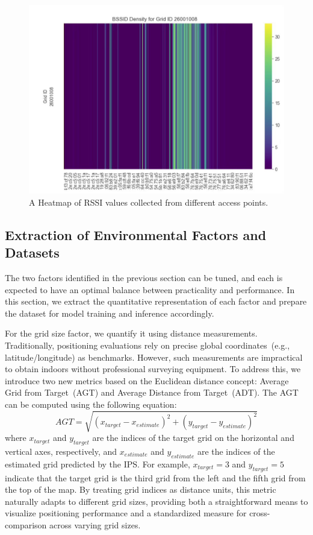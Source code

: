 \documentclass[runningheads]{llncs}
\begin{document}
\begin{figure}[th!]
        \centering
        \includegraphics[width=0.7\linewidth]{figures/meth3.jpg}
        \caption{A Heatmap of RSSI values collected from different access points.}
        \label{fig:heatmap}
\end{figure}

\subsection{Extraction of Environmental Factors and Datasets}\label{ssec:extraction}

The two factors identified in the previous section can be tuned, and each is expected to have an optimal balance between practicality and performance. In this section, we extract the quantitative representation of each factor and prepare the dataset for model training and inference accordingly.

For the grid size factor, we quantify it using distance measurements. Traditionally, positioning evaluations rely on precise global coordinates~(e.g., latitude/longitude) as benchmarks. However, such measurements are impractical to obtain indoors without professional surveying equipment. To address this, we introduce two new metrics based on the Euclidean distance concept: Average Grid from Target~(AGT) and Average Distance from Target~(ADT). The AGT can be computed using the following equation:
\begin{equation}
        AGT = \sqrt{(x_{target} - x_{estimate})^2 + (y_{target} - y_{estimate})^2}
        \label{eq:agt}
\end{equation}
where $x_{target}$ and $y_{target}$ are the indices of the target grid on the horizontal and vertical axes, respectively, and $x_{estimate}$ and $y_{estimate}$ are the indices of the estimated grid predicted by the IPS. For example, $x_{target} = 3$ and $y_{target} = 5$ indicate that the target grid is the third grid from the left and the fifth grid from the top of the map. By treating grid indices as distance units, this metric naturally adapts to different grid sizes, providing both a straightforward means to visualize positioning performance and a standardized measure for cross-comparison across varying grid sizes. 
\end{document}
